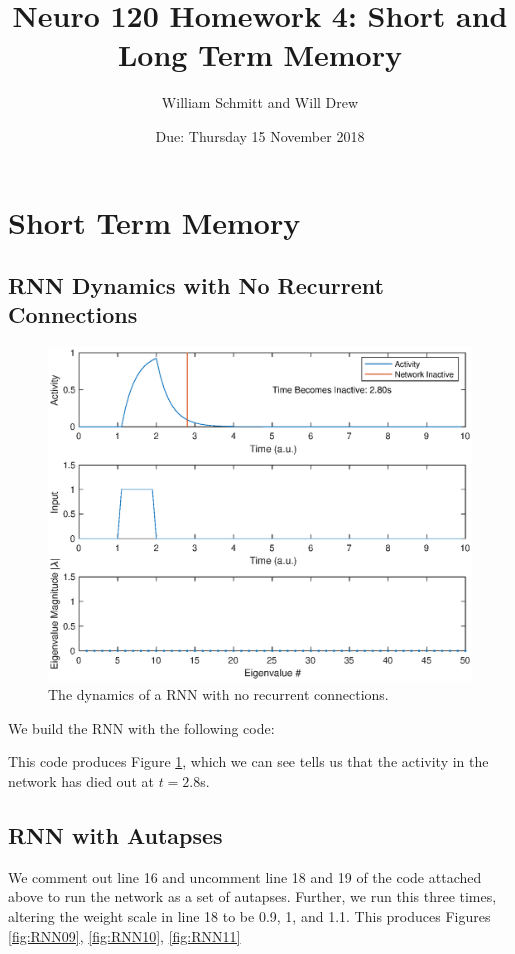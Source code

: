 \documentclass[11pt, oneside]{article}
\title{Neuro 120 Homework 4: Short and Long Term Memory}
\author{William Schmitt and Will Drew}
\date{Due: Thursday 15 November 2018}
\begin{document}
\maketitle

\section{Short Term Memory}

\subsection{RNN Dynamics with No Recurrent Connections}

\begin{figure}[ht!]
\includegraphics[width=1\textwidth]{RNNnoR.eps}
\caption{The dynamics of a RNN with no recurrent connections.}
\label{fig:RNNnoR}
\end{figure}

We build the RNN with the following code:

This code produces Figure \ref{fig:RNNnoR}, which we can see tells us that the activity in the network has died out at $t = 2.8$s.

\subsection{RNN with Autapses}

We comment out line 16 and uncomment line 18 and 19 of the code attached above to run the network as a set of autapses. Further, we run this three times, altering the weight scale in line 18 to be 0.9, 1, and 1.1. This produces Figures \ref{fig:RNN09}, \ref{fig:RNN10}, \ref{fig:RNN11}
\end{document}
